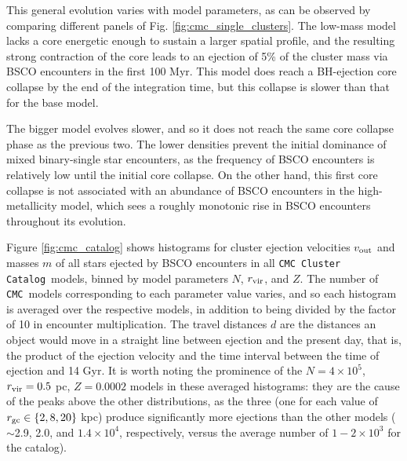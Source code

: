 \documentclass[twocolumn]{aastex631}
\newcommand{\CMC}{\texttt{CMC}}
\newcommand{\CMCcat}{\texttt{CMC Cluster Catalog}}
\begin{document}
This general evolution varies with model parameters, as can be observed by comparing different panels of Fig. \ref{fig:cmc_single_clusters}.
The low-mass model lacks a core energetic enough to sustain a larger spatial profile, and the resulting strong contraction of the core leads to an ejection of 5\% of the cluster mass via BSCO encounters in the first 100 Myr.
This model does reach a BH-ejection core collapse by the end of the integration time, but this collapse is slower than that for the base model.

The bigger model evolves slower, and so it does not reach the same core collapse phase as the previous two.
The lower densities prevent the initial dominance of mixed binary-single star encounters, as the frequency of BSCO encounters is relatively low until the initial core collapse.
On the other hand, this first core collapse is not associated with an abundance of BSCO encounters in the high-metallicity model, which sees a roughly monotonic rise in BSCO encounters throughout its evolution.

Figure \ref{fig:cmc_catalog} shows histograms for cluster ejection velocities $v_{\rm out}$ and masses $m$ of all stars ejected by BSCO encounters in all \CMCcat\ models, binned by model parameters $N$, $r_{\rm vir}$, and $Z$.
The number of \CMC\ models corresponding to each parameter value varies, and so each histogram is averaged over the respective models, in addition to being divided by the factor of 10 in encounter multiplication.
The travel distances $d$ are the distances an object would move in a straight line between ejection and the present day, that is, the product of the ejection velocity and the time interval between the time of ejection and 14 Gyr.
It is worth noting the prominence of the $N = 4\times10^5$, $r_{\rm vir} = 0.5$ pc, $Z = 0.0002$ models in these averaged histograms: they are the cause of the peaks above the other distributions, as the three (one for each value of $r_{\rm gc} \in \{2, 8, 20\}$ kpc) produce significantly more ejections than the other models ($\sim$2.9, 2.0, and $1.4 \times 10^4$, respectively, versus the average number of $1-2 \times 10^3$ for the catalog).

\end{document}
